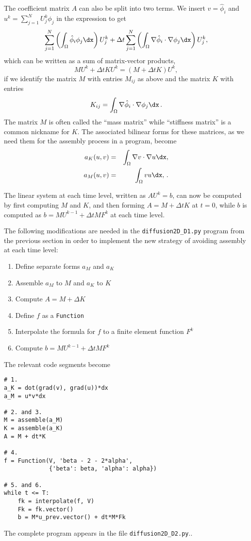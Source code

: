 The coefficient matrix $A$ can also be split into two terms. 
We insert $v=\hat\phi_i$ and $u^k = \sum_{j=1}^NU^k_j\phi_j$ in
the expression  to get
\[ \sum_{j=1}^N\left(\int_\Omega \hat\phi_i\phi_j\dx\right)U^k_j + \Delta t
\sum_{j=1}^N\left(\int_\Omega \nabla\hat\phi_i\cdot\nabla\phi_j\dx\right)U^k_j,
\]
which can be written as a sum of matrix-vector products,
\[ MU^k + \Delta t KU^k = (M + \Delta t K)U^k,\]
if we identify the matrix $M$ with entries $M_{ij}$ as above and
the matrix $K$ with entries
\begin{equation} K_{ij} = \int_\Omega \nabla\hat\phi_i\cdot\nabla\phi_j\dx\langtangenep
\end{equation}
The matrix $M$ is often called the ``mass matrix'' while ``stiffness matrix''
is a common nickname for $K$. The associated bilinear forms for these
matrices, as we need them for the assembly process in a \fenics{}
program, become
\begin{eqnarray}
a_K(u,v) &=& \int_\Omega\nabla v\cdot\nabla u\dx,
\label{langtangen:diffusion:pde1:aK}\\
a_M(u,v) &=& \int_\Omega vu\dx,\label{langtangen:diffusion:pde1:aM}\langtangenep
\end{eqnarray}

The linear system at each time level, written as $AU^k=b$,
can now be computed by first computing $M$ and $K$, and then forming
$A=M+\Delta t K$ at $t=0$, while $b$ is computed as
$b=MU^{k-1} + \Delta tMF^k$ at each time level.

The following modifications are needed in the {\fontsize{12pt}{12pt}\verb!diffusion2D_D1.py!}
program from the previous section in order to implement the new
strategy of avoiding assembly at each time level:
\begin{enumerate}
\item Define separate forms $a_M$ and $a_K$
\item Assemble $a_M$ to $M$ and $a_K$ to $K$
\item Compute $A=M+\Delta K$
\item Define $f$ as a {\fontsize{12pt}{12pt}\texttt{Function}}
\item Interpolate the formula for $f$ to a finite element function $F^k$
\item Compute $b=MU^{k-1} + \Delta tMF^k$
\end{enumerate}
The relevant code segments become
\begin{Verbatim}[fontsize=\fontsize{10pt}{10pt},tabsize=8,baselinestretch=1.05,
fontfamily=tt,xleftmargin=7mm]
# 1.
a_K = dot(grad(v), grad(u))*dx
a_M = u*v*dx

# 2. and 3.
M = assemble(a_M)
K = assemble(a_K)
A = M + dt*K

# 4.
f = Function(V, 'beta - 2 - 2*alpha',
             {'beta': beta, 'alpha': alpha})

# 5. and 6.
while t <= T:
    fk = interpolate(f, V)
    Fk = fk.vector()
    b = M*u_prev.vector() + dt*M*Fk
\end{Verbatim}
\noindent
The complete program appears in the file {\fontsize{12pt}{12pt}\verb!diffusion2D_D2.py!}..    


